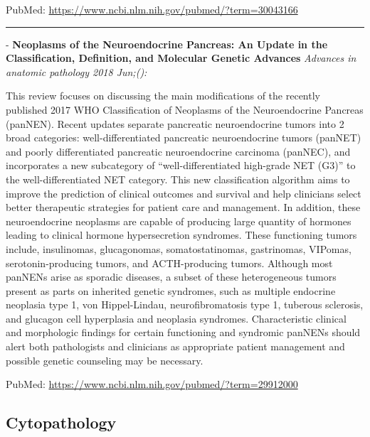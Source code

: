 \documentclass[]{article}
\begin{document}
PubMed: \url{https://www.ncbi.nlm.nih.gov/pubmed/?term=30043166}

{}

{}

\begin{center}\rule{0.5\linewidth}{\linethickness}\end{center}

 - \textbf{Neoplasms of the Neuroendocrine Pancreas: An Update in the
Classification, Definition, and Molecular Genetic Advances}
\emph{Advances in anatomic pathology 2018 Jun;():}

This review focuses on discussing the main modifications of the recently
published 2017 WHO Classification of Neoplasms of the Neuroendocrine
Pancreas (panNEN). Recent updates separate pancreatic neuroendocrine
tumors into 2 broad categories: well-differentiated pancreatic
neuroendocrine tumors (panNET) and poorly differentiated pancreatic
neuroendocrine carcinoma (panNEC), and incorporates a new subcategory of
``well-differentiated high-grade NET (G3)'' to the well-differentiated
NET category. This new classification algorithm aims to improve the
prediction of clinical outcomes and survival and help clinicians select
better therapeutic strategies for patient care and management. In
addition, these neuroendocrine neoplasms are capable of producing large
quantity of hormones leading to clinical hormone hypersecretion
syndromes. These functioning tumors include, insulinomas, glucagonomas,
somatostatinomas, gastrinomas, VIPomas, serotonin-producing tumors, and
ACTH-producing tumors. Although most panNENs arise as sporadic diseases,
a subset of these heterogeneous tumors present as parts on inherited
genetic syndromes, such as multiple endocrine neoplasia type 1, von
Hippel-Lindau, neurofibromatosis type 1, tuberous sclerosis, and
glucagon cell hyperplasia and neoplasia syndromes. Characteristic
clinical and morphologic findings for certain functioning and syndromic
panNENs should alert both pathologists and clinicians as appropriate
patient management and possible genetic counseling may be necessary.

PubMed: \url{https://www.ncbi.nlm.nih.gov/pubmed/?term=29912000}

{}

{}

\pagebreak

\hypertarget{cytopathology}{%
\subsection{Cytopathology}\label{cytopathology}}
\end{document}
